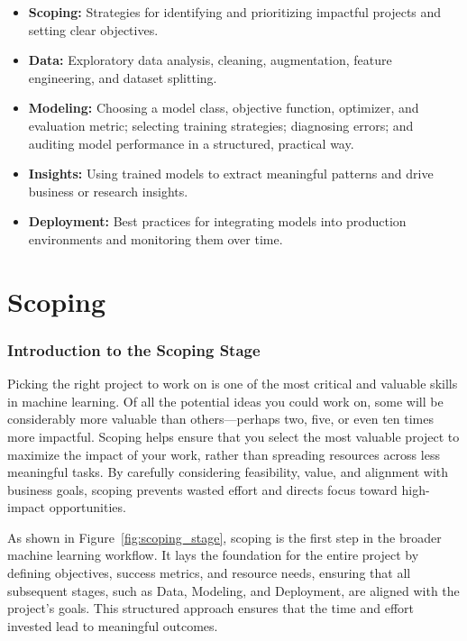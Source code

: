 \documentclass[12pt,openany, draft]{book}
\begin{document}
\begin{itemize}
    \item \textbf{Scoping:} Strategies for identifying and prioritizing impactful projects and setting clear objectives.
    \item \textbf{Data:} Exploratory data analysis, cleaning, augmentation, feature engineering, and dataset splitting.
    \item \textbf{Modeling:} Choosing a model class, objective function, optimizer, and evaluation metric; selecting training strategies; diagnosing errors; and auditing model performance in a structured, practical way.
    \item \textbf{Insights:} Using trained models to extract meaningful patterns and drive business or research insights.
    \item \textbf{Deployment:} Best practices for integrating models into production environments and monitoring them over time.
\end{itemize}





\part{Scoping}

\section*{Introduction to the Scoping Stage}

Picking the right project to work on is one of the most critical and valuable skills in machine learning. Of all the potential ideas you could work on, some will be considerably more valuable than others—perhaps two, five, or even ten times more impactful. Scoping helps ensure that you select the most valuable project to maximize the impact of your work, rather than spreading resources across less meaningful tasks. By carefully considering feasibility, value, and alignment with business goals, scoping prevents wasted effort and directs focus toward high-impact opportunities. \newline

As shown in Figure~\ref{fig:scoping_stage}, scoping is the first step in the broader machine learning workflow. It lays the foundation for the entire project by defining objectives, success metrics, and resource needs, ensuring that all subsequent stages, such as Data, Modeling, and Deployment, are aligned with the project’s goals. This structured approach ensures that the time and effort invested lead to meaningful outcomes.
\end{document}
